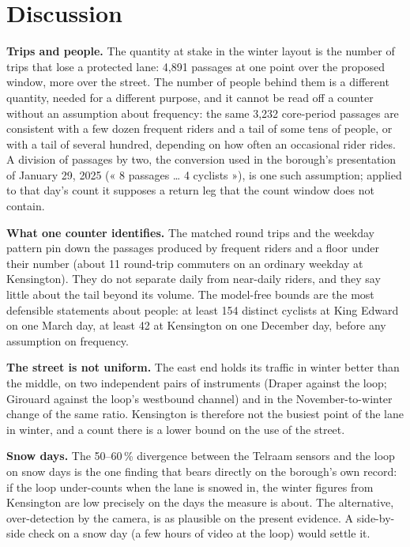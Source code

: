 \documentclass[11pt,a4paper]{article}
\begin{document}
\section{Discussion}
\textbf{Trips and people.} The quantity at stake in the winter layout is the number of trips that lose a protected lane: 4,891 passages at one point over the proposed window, more over the street. The number of people behind them is a different quantity, needed for a different purpose, and it cannot be read off a counter without an assumption about frequency: the same 3,232 core-period passages are consistent with a few dozen frequent riders and a tail of some tens of people, or with a tail of several hundred, depending on how often an occasional rider rides. A division of passages by two, the conversion used in the borough\textquoteright{}s presentation of January 29, 2025 (« 8 passages \ldots{} 4 cyclists »), is one such assumption; applied to that day\textquoteright{}s count it supposes a return leg that the count window does not contain.

\textbf{What one counter identifies.} The matched round trips and the weekday pattern pin down the passages produced by frequent riders and a floor under their number (about 11 round-trip commuters on an ordinary weekday at Kensington). They do not separate daily from near-daily riders, and they say little about the tail beyond its volume. The model-free bounds are the most defensible statements about people: at least 154 distinct cyclists at King Edward on one March day, at least 42 at Kensington on one December day, before any assumption on frequency.

\textbf{The street is not uniform.} The east end holds its traffic in winter better than the middle, on two independent pairs of instruments (Draper against the loop; Girouard against the loop\textquoteright{}s westbound channel) and in the November-to-winter change of the same ratio. Kensington is therefore not the busiest point of the lane in winter, and a count there is a lower bound on the use of the street.

\textbf{Snow days.} The 50--60\,\% divergence between the Telraam sensors and the loop on snow days is the one finding that bears directly on the borough\textquoteright{}s own record: if the loop under-counts when the lane is snowed in, the winter figures from Kensington are low precisely on the days the measure is about. The alternative, over-detection by the camera, is as plausible on the present evidence. A side-by-side check on a snow day (a few hours of video at the loop) would settle it.
\end{document}
